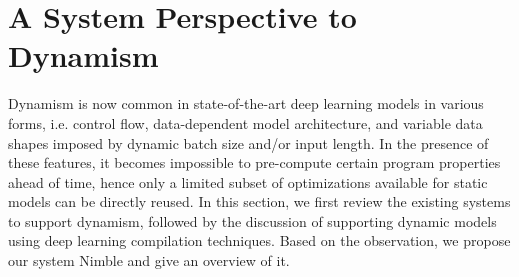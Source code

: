 



\vspace{-1em}
\section{A System Perspective to Dynamism}
\label{sec:nimble-background}


Dynamism is now common in state-of-the-art deep learning models in various forms, i.e. control flow, data-dependent model architecture, and variable data shapes imposed by dynamic batch size and/or input length.
In the presence of these features, it becomes impossible to pre-compute certain program properties ahead of time, hence only a limited subset of optimizations available for static models can be directly reused.
In this section, we first review the existing systems to support dynamism, followed by the discussion of supporting dynamic models using deep learning compilation techniques. Based on the observation, we propose our system Nimble and give an overview of it.

